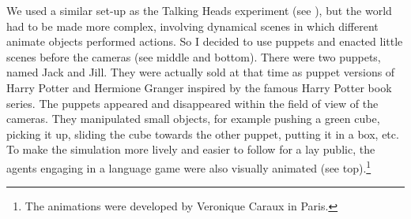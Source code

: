 We used a similar set-up as the Talking Heads experiment (see ), but 
the world had to be made more complex, involving dynamical scenes in which 
different animate objects performed actions. So I decided to use 
puppets and enacted little scenes before the cameras (see  middle and bottom). 
There were two puppets, named Jack and Jill. They were actually sold at that time as puppet versions of Harry 
Potter and Hermione Granger inspired by the famous Harry Potter book series. 
The puppets appeared and disappeared within the field of view of the cameras. 
They manipulated small objects, for example pushing a green cube, picking it up, sliding the cube
towards the other puppet, putting it in a box, etc. To make the simulation more lively and easier to follow for 
a lay public, the agents engaging in a language game were also visually animated (see 
 top).\footnote{The animations were developed by Veronique Caraux in Paris.}


